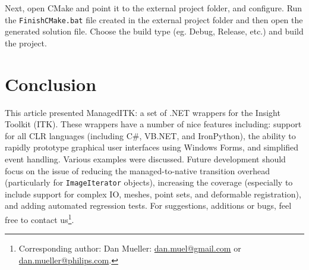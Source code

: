 \documentclass{InsightArticle}
\def\code#1{\texttt{#1}}
\begin{document}
Next, open CMake and point it to the external project folder,
and configure. Run the \code{FinishCMake.bat} file created in the
external project folder and then open the generated solution file.
Choose the build type (eg. Debug, Release, etc.) and build the
project.

\section{Conclusion}
This article presented ManagedITK: a set of .NET wrappers for the Insight
Toolkit (ITK).
These wrappers have a number of nice features including:
support for all CLR languages (including C\#, VB.NET, and IronPython),
the ability to rapidly prototype graphical user interfaces using Windows Forms,
and simplified event handling.
Various examples were discussed.
Future development should focus on the issue of reducing the managed-to-native
transition overhead (particularly for \code{ImageIterator} objects),
increasing the coverage 
(especially to include support for complex IO, meshes, point sets,
and deformable registration),
and adding automated regression tests.
For suggestions, additions or bugs, feel free to contact 
us\footnote{Corresponding author: Dan Mueller: %
\href{mailto:dan.muel@gmail.com}{dan.muel@gmail.com} or
\href{mailto:dan.mueller@philips.com}{dan.mueller@philips.com}.}.

\newpage


\end{document}

